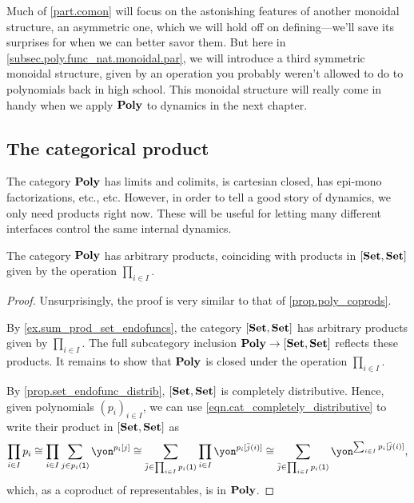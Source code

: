 \documentclass[Book-Poly]{subfiles}
\begin{document}
Much of \cref{part.comon} will focus on the astonishing features of another monoidal structure, an asymmetric one, which we will hold off on defining---we'll save its surprises for when we can better savor them.
But here in \cref{subsec.poly.func_nat.monoidal.par}, we will introduce a third symmetric monoidal structure, given by an operation you probably weren't allowed to do to polynomials back in high school.
This monoidal structure will really come in handy when we apply $\mathbf{Poly}$ to dynamics in the next chapter.

\subsection{The categorical product} \label{subsec.poly.func_nat.monoidal.prod}
The category $\mathbf{Poly}$ has limits and colimits, is cartesian closed, has epi-mono factorizations, etc., etc. However, in order to tell a good story of dynamics, we only need products right now. These will be useful for letting many different interfaces control the same internal dynamics.

\begin{proposition}\label{prop.poly_prods}
The category $\mathbf{Poly}$ has arbitrary products, coinciding with products in $[\mathbf{Set},\mathbf{Set}]$ given by the operation $\prod_{i \in I}$.
\end{proposition}
\begin{proof}
Unsurprisingly, the proof is very similar to that of \cref{prop.poly_coprods}.

By \cref{ex.sum_prod_set_endofuncs}, the category $[\mathbf{Set},\mathbf{Set}]$ has arbitrary products given by $\prod_{i \in I}$.
The full subcategory inclusion $\mathbf{Poly} \to [\mathbf{Set},\mathbf{Set}]$ reflects these products.
It remains to show that $\mathbf{Poly}$ is closed under the operation $\prod_{i \in I}$.

By \cref{prop.set_endofunc_distrib}, $[\mathbf{Set},\mathbf{Set}]$ is completely distributive.
Hence, given polynomials $(p_i)_{i \in I}$, we can use \eqref{eqn.cat_completely_distributive} to write their product in $[\mathbf{Set},\mathbf{Set}]$ as
\begin{equation} \label{eqn.poly_prod}
    \prod_{i \in I} p_i \iso \prod_{i \in I} \sum_{j \in p_i(\1)} \yon^{p_i[j]} \iso \sum_{\bar{j} \in \prod_{i \in I} p_i(\1)} \prod_{i \in I} \yon^{p_i[\bar{j}(i)]} \iso \sum_{\bar{j} \in \prod_{i \in I} p_i(\1)} \yon^{\sum_{i \in I} p_i[\bar{j}(i)]},
\end{equation}
which, as a coproduct of representables, is in $\mathbf{Poly}$.
\end{proof}
\end{document}
